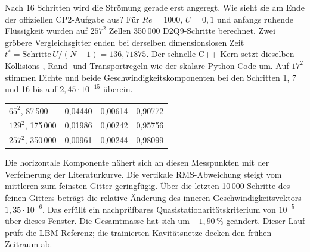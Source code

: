 Nach 16 Schritten wird die Strömung gerade erst angeregt. Wie sieht sie am Ende der offiziellen CP2-Aufgabe aus? Für \(Re=1000\), \(U=0{,}1\) und anfangs ruhende Flüssigkeit wurden auf \(257^2\) Zellen 350\,000 D2Q9-Schritte berechnet. Zwei gröbere Vergleichsgitter enden bei derselben dimensionslosen Zeit \(t^*=\mathrm{Schritte}\,U/(N-1)=136{,}71875\). Der schnelle C++-Kern setzt dieselben Kollisions-, Rand- und Transportregeln wie der skalare Python-Code um. Auf \(17^2\) stimmen Dichte und beide Geschwindigkeitskomponenten bei den Schritten 1, 7 und 16 bis auf \(2{,}45\cdot10^{-15}\) überein.
{\tblstart\begin{tabularx}{\linewidth}{@{}Yrrr@{}}\toprule
{}&&&\\\midrule
\(65^2\), 87\,500&0,04440&0,00614&0,90772\\
\(129^2\), 175\,000&0,01986&0,00242&0,95756\\
\(257^2\), 350\,000&0,00961&0,00244&0,98099\\\bottomrule\end{tabularx}\par}
Die horizontale Komponente nähert sich an diesen Messpunkten mit der Verfeinerung der Literaturkurve. Die vertikale RMS-Abweichung steigt vom mittleren zum feinsten Gitter geringfügig. Über die letzten 10\,000 Schritte des feinen Gitters beträgt die relative Änderung des inneren Geschwindigkeitsvektors \(1{,}35\cdot10^{-6}\). Das erfüllt ein nachprüfbares Quasistationaritätskriterium von \(10^{-5}\) über dieses Fenster. Die Gesamtmasse hat sich um \(-1{,}90\,\%\) geändert. Dieser Lauf prüft die LBM-Referenz; die trainierten Kavitätsnetze decken den frühen Zeitraum ab.
